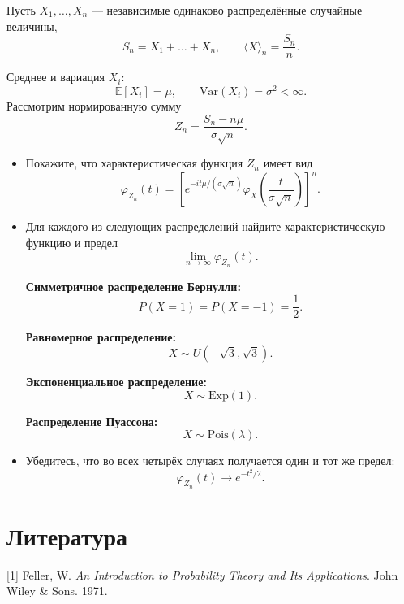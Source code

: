 \documentclass[
  russian,
  11pt,
  a4paper,
  open=any]{scrbook}
\newlength{\cslhangindent}
\newenvironment{CSLReferences}[2] %
 {\begin{list}{}{%
  \setlength{\itemindent}{0pt}
  \setlength{\leftmargin}{0pt}
  \setlength{\parsep}{0pt}
  \ifodd #1
   \setlength{\leftmargin}{\cslhangindent}
   \setlength{\itemindent}{-1\cslhangindent}
  \fi
  \setlength{\itemsep}{#2\baselineskip}}}
 {\end{list}}
\begin{document}
\begin{semanticpdfbox}[colback=BookCoralSoft,borderline west={1.2mm}{0pt}{BookCoral}]

\par\nopagebreak[4]\vspace{1.2mm}

Пусть \(X_1,\dots,X_n\) --- независимые одинаково распределённые
случайные величины, \[
S_n=X_1+\dots+X_n,
\qquad
\langle X\rangle_n=\frac{S_n}{n}.
\]

Среднее и вариация \(X_i\): \[
\mathbb{E}[X_i]=\mu,
\qquad
\mathrm{Var}(X_i)=\sigma^2<\infty.
\] Рассмотрим нормированную сумму \[
Z_n=
\frac{S_n-n\mu}{\sigma\sqrt n}.
\]

\begin{itemize}
\item
  Покажите, что характеристическая функция \(Z_n\) имеет вид \[
   \varphi_{Z_n}(t) =
   \left[
   e^{-it\mu/(\sigma\sqrt n)}
   \varphi_X\left(\frac{t}{\sigma\sqrt n}\right)
   \right]^n.
   \]
\item
  Для каждого из следующих распределений найдите характеристическую
  функцию и предел \[
   \lim_{n\to\infty}\varphi_{Z_n}(t).
   \]

  \textbf{Симметричное распределение Бернулли:} \[
   P(X=1)=P(X=-1)=\frac12.
   \]

  \textbf{Равномерное распределение:} \[
   X\sim U(-\sqrt3,\sqrt3).
   \]

  \textbf{Экспоненциальное распределение:} \[
   X\sim \mathrm{Exp}(1).
   \]

  \textbf{Распределение Пуассона:} \[
   X\sim \mathrm{Pois}(\lambda).
   \]
\item
  Убедитесь, что во всех четырёх случаях получается один и тот же
  предел: \[
   \varphi_{Z_n}(t)\to e^{-t^2/2}.
   \]
\end{itemize}

\end{semanticpdfbox}

\section*{Литература}\label{ux43bux438ux442ux435ux440ux430ux442ux443ux440ux430-2}


\protect{}\label{refs}
\begin{CSLReferences}{0}{0}
{[}1{]} Feller, W. \emph{An Introduction to Probability Theory and Its
Applications}. John Wiley \& Sons. 1971.

\end{CSLReferences}
\end{document}
